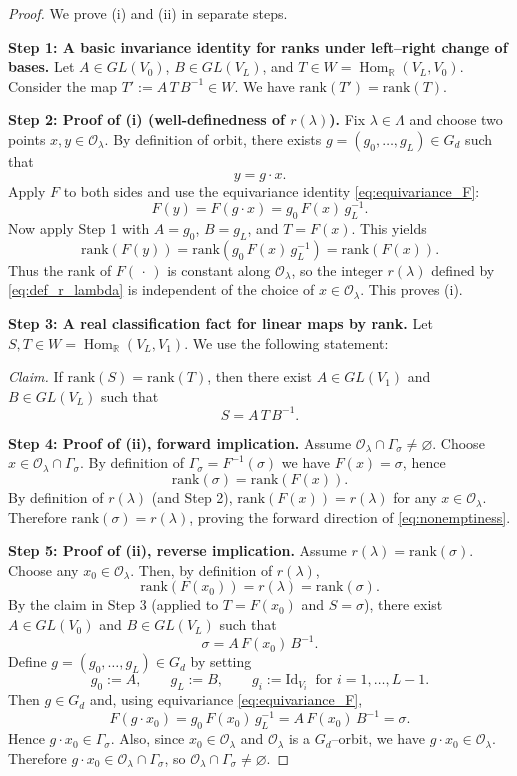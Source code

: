 \documentclass{article}
\newcommand{\Hom}{\operatorname{Hom}}
\theoremstyle{definition}
\begin{document}
\begin{proof}
We prove (i) and (ii) in separate steps.

\medskip\noindent
\textbf{Step 1: A basic invariance identity for ranks under left--right change of bases.}
Let $A\in GL(V_0)$, $B\in GL(V_L)$, and $T\in W=\Hom_{\mathbb{R}}(V_L,V_0)$.
Consider the map $T':=A\,T\,B^{-1}\in W$.
We have $\mathrm{rank}(T')=\mathrm{rank}(T)$.

\medskip\noindent
\textbf{Step 2: Proof of (i) (well-definedness of $r(\lambda)$).}
Fix $\lambda\in\Lambda$ and choose two points $x,y\in \mathcal O_\lambda$.
By definition of orbit, there exists $g=(g_0,\dots,g_L)\in G_d$ such that
\[
y=g\cdot x.
\]
Apply $F$ to both sides and use the equivariance identity \eqref{eq:equivariance_F}:
\[
F(y)=F(g\cdot x)=g_0\,F(x)\,g_L^{-1}.
\]
Now apply Step 1 with $A=g_0$, $B=g_L$, and $T=F(x)$. This yields
\[
\mathrm{rank}(F(y))=\mathrm{rank}(g_0\,F(x)\,g_L^{-1})=\mathrm{rank}(F(x)).
\]
Thus the rank of $F(\,\cdot\,)$ is constant along $\mathcal O_\lambda$, so the integer $r(\lambda)$
defined by \eqref{eq:def_r_lambda} is independent of the choice of $x\in\mathcal O_\lambda$.
This proves (i).

\medskip\noindent
\textbf{Step 3: A real classification fact for linear maps by rank.}
Let $S,T\in W=\Hom_{\mathbb{R}}(V_L,V_1)$. We use the following statement:

\smallskip\noindent
\emph{Claim.} If $\mathrm{rank}(S)=\mathrm{rank}(T)$, then there exist $A\in GL(V_1)$ and $B\in GL(V_L)$ such that
\begin{equation}
\label{eq:rank_equivalence}
S=A\,T\,B^{-1}.
\end{equation}

\medskip\noindent
\textbf{Step 4: Proof of (ii), forward implication.}
Assume $\mathcal O_\lambda\cap \Gamma_\sigma\neq \varnothing$.
Choose $x\in \mathcal O_\lambda\cap \Gamma_\sigma$.
By definition of $\Gamma_\sigma=F^{-1}(\sigma)$ we have $F(x)=\sigma$, hence
\[
\mathrm{rank}(\sigma)=\mathrm{rank}(F(x)).
\]
By definition of $r(\lambda)$ (and Step 2), $\mathrm{rank}(F(x))=r(\lambda)$ for any $x\in\mathcal O_\lambda$.
Therefore $\mathrm{rank}(\sigma)=r(\lambda)$, proving the forward direction of \eqref{eq:nonemptiness}.

\medskip\noindent
\textbf{Step 5: Proof of (ii), reverse implication.}
Assume $r(\lambda)=\mathrm{rank}(\sigma)$.
Choose any $x_0\in\mathcal O_\lambda$.
Then, by definition of $r(\lambda)$,
\[
\mathrm{rank}(F(x_0))=r(\lambda)=\mathrm{rank}(\sigma).
\]
By the claim in Step 3 (applied to $T=F(x_0)$ and $S=\sigma$), there exist
$A\in GL(V_0)$ and $B\in GL(V_L)$ such that
\[
\sigma=A\,F(x_0)\,B^{-1}.
\]
Define $g=(g_0,\dots,g_L)\in G_d$ by setting
\[
g_0:=A,\qquad g_L:=B,\qquad g_i:=\mathrm{Id}_{V_i}\ \text{ for } i=1,\dots,L-1.
\]
Then $g\in G_d$ and, using equivariance \eqref{eq:equivariance_F},
\[
F(g\cdot x_0)=g_0\,F(x_0)\,g_L^{-1}=A\,F(x_0)\,B^{-1}=\sigma.
\]
Hence $g\cdot x_0\in \Gamma_\sigma$.
Also, since $x_0\in\mathcal O_\lambda$ and $\mathcal O_\lambda$ is a $G_d$--orbit, we have $g\cdot x_0\in\mathcal O_\lambda$.
Therefore $g\cdot x_0\in \mathcal O_\lambda\cap \Gamma_\sigma$, so $\mathcal O_\lambda\cap \Gamma_\sigma\neq\varnothing$.


\end{proof}
\end{document}
